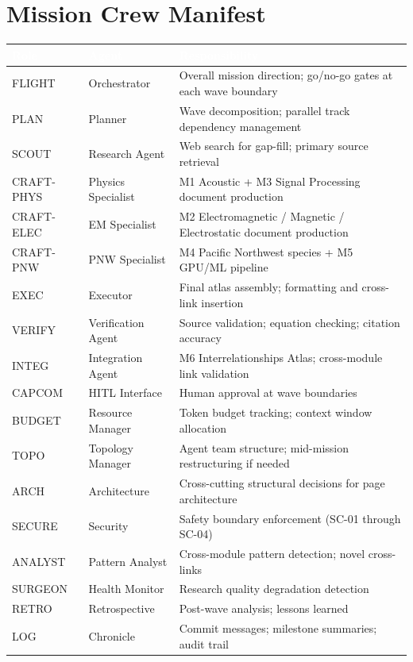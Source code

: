 \documentclass[11pt,letterpaper]{article}
\newcommand{\tableheader}[1]{\textbf{\sffamily\textcolor{white}{#1}}}
\begin{document}
\section{Mission Crew Manifest}

\begin{center}
\begin{tabularx}{\textwidth}{L{2cm}L{3cm}X}
\toprule
{}
\tableheader{Role} & \tableheader{Agent} & \tableheader{Responsibility} \\
\midrule
FLIGHT & Orchestrator & Overall mission direction; go/no-go gates at each wave boundary \\
PLAN & Planner & Wave decomposition; parallel track dependency management \\
SCOUT & Research Agent & Web search for gap-fill; primary source retrieval \\
CRAFT-PHYS & Physics Specialist & M1 Acoustic + M3 Signal Processing document production \\
CRAFT-ELEC & EM Specialist & M2 Electromagnetic / Magnetic / Electrostatic document production \\
CRAFT-PNW & PNW Specialist & M4 Pacific Northwest species + M5 GPU/ML pipeline \\
EXEC & Executor & Final atlas assembly; formatting and cross-link insertion \\
VERIFY & Verification Agent & Source validation; equation checking; citation accuracy \\
INTEG & Integration Agent & M6 Interrelationships Atlas; cross-module link validation \\
CAPCOM & HITL Interface & Human approval at wave boundaries \\
BUDGET & Resource Manager & Token budget tracking; context window allocation \\
TOPO & Topology Manager & Agent team structure; mid-mission restructuring if needed \\
ARCH & Architecture & Cross-cutting structural decisions for page architecture \\
SECURE & Security & Safety boundary enforcement (SC-01 through SC-04) \\
ANALYST & Pattern Analyst & Cross-module pattern detection; novel cross-links \\
SURGEON & Health Monitor & Research quality degradation detection \\
RETRO & Retrospective & Post-wave analysis; lessons learned \\
LOG & Chronicle & Commit messages; milestone summaries; audit trail \\
\bottomrule
\end{tabularx}
\end{center}
\end{document}
